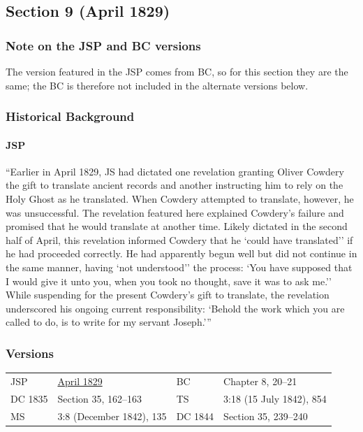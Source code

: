 \subsection{Section 9 (April 1829)}
	\label{DC9}
	
	\subsubsection{Note on the JSP and BC versions}
	
		The version featured in the JSP comes from BC, so for this section they are the same; the BC is therefore not included in the alternate versions below.
	
	\subsubsection{Historical Background}
		\label{DC9-HB}
		
		\paragraph{JSP}
		
			``Earlier in April 1829, JS had dictated one revelation granting Oliver Cowdery the gift to translate ancient records and another instructing him to rely on the Holy Ghost as he translated. When Cowdery attempted to translate, however, he was unsuccessful. The revelation featured here explained Cowdery's failure and promised that he would translate at another time. Likely dictated in the second half of April, this revelation informed Cowdery that he `could have translated'' if he had proceeded correctly. He had apparently begun well but did not continue in the same manner, having `not understood'' the process: `You have supposed that I would give it unto you, when you took no thought, save it was to ask me.'' While suspending for the present Cowdery's gift to translate, the revelation underscored his ongoing current responsibility: `Behold the work which you are called to do, is to write for my servant Joseph.'''
		
	\subsubsection{Versions}
		\label{DC9-V}
		
		\begin{tabular}{p{1in}p{2in}p{1in}p{2in}}
			JSP		& \hyperref[EMS-1828-1829-JS-APR-1829-D]{April 1829}	& BC & Chapter 8, 20--21 \\
			DC 1835	& Section 35, 162--163									& TS & 3:18 (15 July 1842), 854 \\
			MS		& 3:8 (December 1842), 135								& DC 1844 & Section 35, 239--240 \\
		\end{tabular}
		

